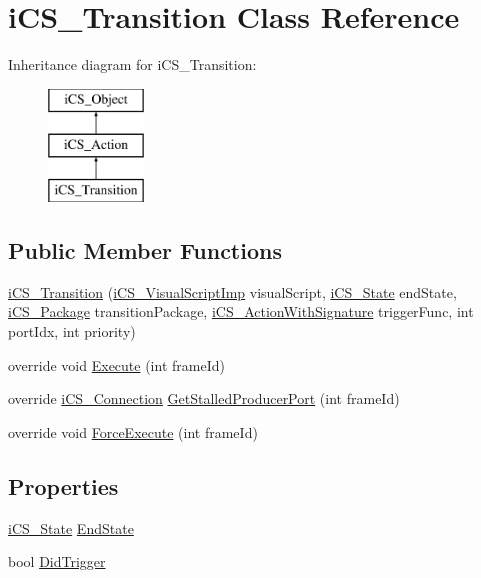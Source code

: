 \hypertarget{classi_c_s___transition}{\section{i\+C\+S\+\_\+\+Transition Class Reference}
\label{classi_c_s___transition}
}
Inheritance diagram for i\+C\+S\+\_\+\+Transition\+:\begin{figure}[H]
\begin{center}
\leavevmode
\includegraphics[height=3.000000cm]{classi_c_s___transition}
\end{center}
\end{figure}
\subsection*{Public Member Functions}
\begin{DoxyCompactItemize}
\item 
\hyperlink{classi_c_s___transition_a2919c557110b697ecf26ed0d19b12849}{i\+C\+S\+\_\+\+Transition} (\hyperlink{classi_c_s___visual_script_imp}{i\+C\+S\+\_\+\+Visual\+Script\+Imp} visual\+Script, \hyperlink{classi_c_s___state}{i\+C\+S\+\_\+\+State} end\+State, \hyperlink{classi_c_s___package}{i\+C\+S\+\_\+\+Package} transition\+Package, \hyperlink{classi_c_s___action_with_signature}{i\+C\+S\+\_\+\+Action\+With\+Signature} trigger\+Func, int port\+Idx, int priority)
\item 
override void \hyperlink{classi_c_s___transition_a72c58ac51652b3e6ed58e9a606497927}{Execute} (int frame\+Id)
\item 
override \hyperlink{classi_c_s___connection}{i\+C\+S\+\_\+\+Connection} \hyperlink{classi_c_s___transition_a0d91b871cd4c8b94b7c280b12468b1e7}{Get\+Stalled\+Producer\+Port} (int frame\+Id)
\item 
override void \hyperlink{classi_c_s___transition_ab4e62a2fc68c5091fa6cd724b9601744}{Force\+Execute} (int frame\+Id)
\end{DoxyCompactItemize}
\subsection*{Properties}
\begin{DoxyCompactItemize}
\item 
\hyperlink{classi_c_s___state}{i\+C\+S\+\_\+\+State} \hyperlink{classi_c_s___transition_aaa771f098e26641c45bd0251a720491f}{End\+State}
\item 
bool \hyperlink{classi_c_s___transition_a24426d49439effbd9f7bbea9ea0615ab}{Did\+Trigger}
\end{DoxyCompactItemize}


